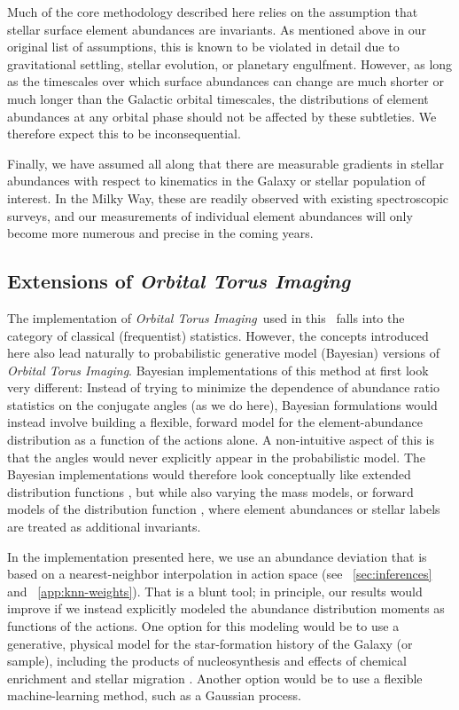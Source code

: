 \documentclass[modern]{aastex63}
\newcommand{\methodname}{\textsl{Orbital Torus Imaging}}
\begin{document}
Much of the core methodology described here relies on the assumption that
stellar surface element abundances are invariants.
As mentioned above in our original list of assumptions, this is known to be
violated in detail due to gravitational settling, stellar evolution, or
planetary engulfment.
However, as long as the timescales over which surface abundances can change are
much shorter or much longer than the Galactic orbital timescales, the
distributions of element abundances at any orbital phase should not be affected
by these subtleties.
We therefore expect this to be inconsequential.

Finally, we have assumed all along that there are measurable gradients in
stellar abundances with respect to kinematics in the Galaxy or stellar
population of interest.
In the Milky Way, these are readily observed with existing spectroscopic
surveys, and our measurements of individual element abundances will only become
more numerous and precise in the coming years.


\subsection{Extensions of \methodname}

The implementation of \methodname\ used in this \documentname\ falls into the
category of classical (frequentist) statistics.
However, the concepts introduced here also lead naturally to probabilistic
generative model (Bayesian) versions of \methodname.
Bayesian implementations of this method at first look very different:
Instead of trying to minimize the dependence of abundance ratio statistics on
the conjugate angles (as we do here), Bayesian formulations would instead
involve building a flexible, forward model for the element-abundance
distribution as a function of the actions alone.
A non-intuitive aspect of this is that the angles would never explicitly appear
in the probabilistic model.
The Bayesian implementations would therefore look conceptually like extended
distribution functions \citep{Sanders:2015}, but while also varying the mass
models, or forward models of the distribution function
\citep[e.g.,][]{Magorrian:2014}, where element abundances or stellar labels are
treated as additional invariants.

In the implementation presented here, we use an abundance deviation that is
based on a nearest-neighbor interpolation in action space (see
\sectionname~\ref{sec:inferences} and \appendixname~\ref{app:knn-weights}).
That is a blunt tool; in principle, our results would improve if we instead
explicitly modeled the abundance distribution moments as functions of the
actions.
One option for this modeling would be to use a generative, physical model for
the star-formation history of the Galaxy (or sample), including the products of
nucleosynthesis and effects of chemical enrichment and stellar migration
\citep[similar to what is done in][]{Sanders:2015}.
Another option would be to use a flexible machine-learning method, such as a
Gaussian process.
\end{document}
